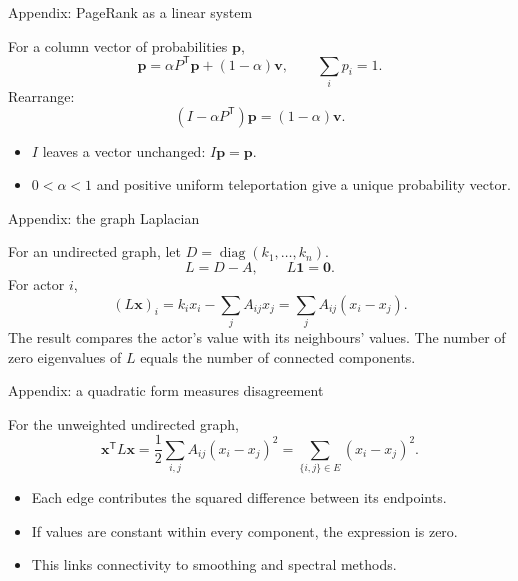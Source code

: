 \documentclass[aspectratio=169,11pt]{beamer}
\newcommand{\ones}{\mathbf{1}}
\begin{document}
\appendix

\begin{frame}{Appendix: PageRank as a linear system}

For a column vector of probabilities $\mathbf{p}$,
\[\mathbf{p}=\alpha P^{\mathsf T}\mathbf{p}+(1-\alpha)\mathbf{v},
\qquad\sum_i p_i=1.\]
Rearrange:
\[\boxed{(I-\alpha P^{\mathsf T})\mathbf{p}=(1-\alpha)\mathbf{v}.}\]
\begin{itemize}
\item $I$ leaves a vector unchanged: $I\mathbf{p}=\mathbf{p}$.
\item $0<\alpha<1$ and positive uniform teleportation give a unique probability vector.
\end{itemize}


\end{frame}

\begin{frame}{Appendix: the graph Laplacian}

For an undirected graph, let $D=\operatorname{diag}(k_1,\ldots,k_n)$.
\[L=D-A,\qquad L\ones=\mathbf{0}.\]
For actor $i$,
\[(L\mathbf{x})_i=k_ix_i-\sum_j A_{ij}x_j
=\sum_j A_{ij}(x_i-x_j).\]
The result compares the actor's value with its neighbours' values.
\medskip
The number of zero eigenvalues of $L$ equals the number of connected components.


\end{frame}

\begin{frame}{Appendix: a quadratic form measures disagreement}

For the unweighted undirected graph,
\[\mathbf{x}^{\mathsf T}L\mathbf{x}
=\frac12\sum_{i,j}A_{ij}(x_i-x_j)^2
=\sum_{\{i,j\}\in E}(x_i-x_j)^2.\]
\begin{itemize}
\item Each edge contributes the squared difference between its endpoints.
\medskip\item If values are constant within every component, the expression is zero.
\medskip\item This links connectivity to smoothing and spectral methods.
\end{itemize}


\end{frame}
\end{document}
